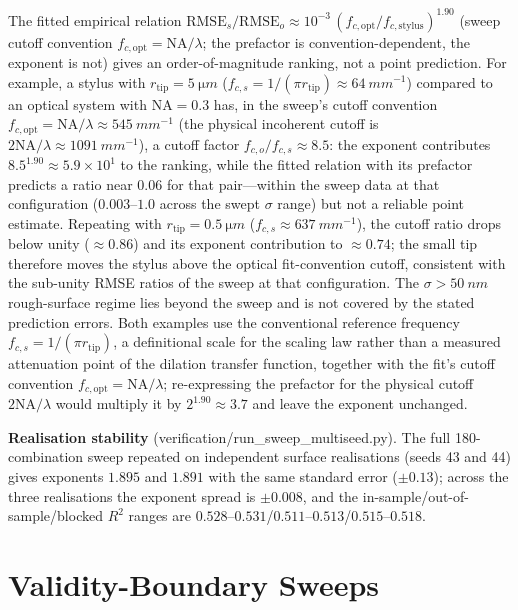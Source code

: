 \documentclass[review,12pt]{elsarticle}
\begin{document}
The fitted empirical relation $\mathrm{RMSE}_s/\mathrm{RMSE}_o \approx 10^{-3}\,(f_{c,\mathrm{opt}}/f_{c,\mathrm{stylus}})^{1.90}$ (sweep cutoff convention $f_{c,\mathrm{opt}}=\mathrm{NA}/\lambda$; the prefactor is convention-dependent, the exponent is not) gives an order-of-magnitude ranking, not a point prediction. For example, a stylus with $r_\mathrm{tip}=\SI{5}{\micro m}$ ($f_{c,s}=1/(\pi r_\mathrm{tip})\approx\SI{64}{mm^{-1}}$) compared to an optical system with $\mathrm{NA}=0.3$ has, in the sweep's cutoff convention $f_{c,\mathrm{opt}}=\mathrm{NA}/\lambda\approx\SI{545}{mm^{-1}}$ (the physical incoherent cutoff is $2\mathrm{NA}/\lambda\approx\SI{1091}{mm^{-1}}$), a cutoff factor $f_{c,o}/f_{c,s}\approx8.5$: the exponent contributes $8.5^{1.90}\approx5.9\times10^{1}$ to the ranking, while the fitted relation with its prefactor predicts a ratio near $0.06$ for that pair---within the sweep data at that configuration ($0.003$--$1.0$ across the swept $\sigma$ range) but not a reliable point estimate. Repeating with $r_\mathrm{tip}=\SI{0.5}{\micro m}$ ($f_{c,s}\approx\SI{637}{mm^{-1}}$), the cutoff ratio drops below unity ($\approx0.86$) and its exponent contribution to $\approx0.74$; the small tip therefore moves the stylus above the optical fit-convention cutoff, consistent with the sub-unity RMSE ratios of the sweep at that configuration. The $\sigma>\SI{50}{nm}$ rough-surface regime lies beyond the sweep and is not covered by the stated prediction errors. Both examples use the conventional reference frequency $f_{c,s}=1/(\pi r_\mathrm{tip})$, a definitional scale for the scaling law rather than a measured attenuation point of the dilation transfer function, together with the fit's cutoff convention $f_{c,\mathrm{opt}}=\mathrm{NA}/\lambda$; re-expressing the prefactor for the physical cutoff $2\mathrm{NA}/\lambda$ would multiply it by $2^{1.90}\approx3.7$ and leave the exponent unchanged.

\textbf{Realisation stability} (verification/run\_sweep\_multiseed.py). The full 180-combination sweep repeated on independent surface realisations (seeds 43 and 44) gives exponents $1.895$ and $1.891$ with the same standard error ($\pm0.13$); across the three realisations the exponent spread is $\pm0.008$, and the in-sample/out-of-sample/blocked $R^2$ ranges are $0.528$--$0.531$/$0.511$--$0.513$/$0.515$--$0.518$.

\section{Validity-Boundary Sweeps}
\label{S8}
\end{document}
